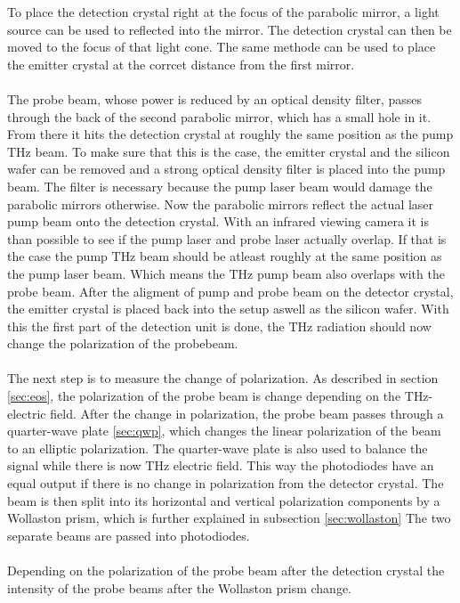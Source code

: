 To place the detection crystal right at the focus of the parabolic mirror, a light source can be used to reflected into the mirror.
The detection crystal can then be moved to the focus of that light cone.
The same methode can be used to place the emitter crystal at the corrcet distance from the first mirror.
\\\\
The probe beam, whose power is reduced by an optical density filter, passes through the back of the second parabolic mirror, which has a small hole in it.
From there it hits the detection crystal at roughly the same position as the pump $\si{\tera\hertz}$ beam.
To make sure that this is the case, the emitter crystal and the silicon wafer can be removed and a strong optical density filter is placed into the pump beam.
The filter is necessary because the pump laser beam would damage the parabolic mirrors otherwise.
Now the parabolic mirrors reflect the actual laser pump beam onto the detection crystal.
With an infrared viewing camera it is than possible to see if the pump laser and probe laser actually overlap.
If that is the case the pump $\si{\tera\hertz}$ beam should be atleast roughly at the same position as the pump laser beam.
Which means the $\si{\tera\hertz}$ pump beam also overlaps with the probe beam.
After the aligment of pump and probe beam on the detector crystal, the emitter crystal is placed back into the setup aswell as the silicon wafer.
With this the first part of the detection unit is done, the $\si{\tera\hertz}$ radiation should now change the polarization of the probebeam.
\\\\
The next step is to measure the change of polarization.
As described in section \ref{sec:eos}, the polarization of the probe beam is change depending on the $\si{\tera\hertz}$-electric field.
After the change in polarization, the probe beam passes through a quarter-wave plate \ref{sec:qwp}, which changes the linear polarization of the beam to an elliptic polarization.
The quarter-wave plate is also used to balance the signal while there is now $\si{\tera\hertz}$ electric field.
This way the photodiodes have an equal output if there is no change in polarization from the detector crystal.
The beam is then split into its horizontal and vertical polarization components by a Wollaston prism, which is further explained in subsection \ref{sec:wollaston}
The two separate beams are passed into photodiodes.
\\\\
Depending on the polarization of the probe beam after the detection crystal the intensity of the probe beams after the Wollaston prism change.
